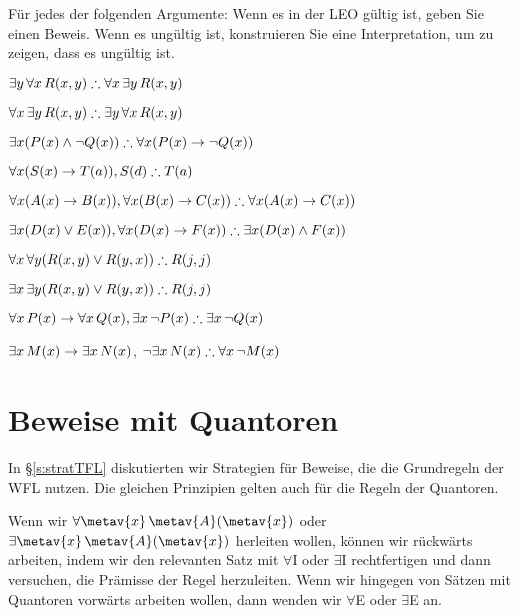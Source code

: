 \solutions
\problempart
\label{pr.FOLvalidornot}
Für jedes der folgenden Argumente: Wenn es in der LEO gültig ist, geben Sie einen Beweis. Wenn es ungültig ist, konstruieren Sie eine Interpretation, um zu zeigen, dass es ungültig ist.
\begin{earg}
\item $\exists y\,\forall x\,\atom{R}{x,y} \therefore \forall x\,\exists y\,\atom{R}{x,y}$
\item $\forall x\,\exists y\,\atom{R}{x,y} \therefore  \exists y\,\forall x\,\atom{R}{x,y}$
\item $\exists x(\atom{P}{x} \eand \enot \atom{Q}{x}) \therefore \forall x(\atom{P}{x} \eif \enot \atom{Q}{x})$
\item $\forall x(\atom{S}{x} \eif \atom{T}{a}), \atom{S}{d} \therefore \atom{T}{a}$
\item $\forall x(\atom{A}{x}\eif \atom{B}{x}), \forall x(\atom{B}{x} \eif \atom{C}{x}) \therefore \forall x(\atom{A}{x} \eif \atom{C}{x})$
\item $\exists x(\atom{D}{x} \eor \atom{E}{x}), \forall x(\atom{D}{x} \eif \atom{F}{x}) \therefore \exists x(\atom{D}{x} \eand \atom{F}{x})$
\item $\forall x\,\forall y(\atom{R}{x,y} \eor \atom{R}{y,x}) \therefore \atom{R}{j,j}$
\item $\exists x\,\exists y(\atom{R}{x,y} \eor \atom{R}{y,x}) \therefore \atom{R}{j,j}$
\item $\forall x\,\atom{P}{x} \eif \forall x\,\atom{Q}{x}, \exists x\, \enot\atom{P}{x} \therefore \exists x\, \enot \atom{Q}{x}$
\item $\exists x\,\mathord{M}(x) \rightarrow \exists x\,\mathord{N}(x)$, $\enot \exists x\,\atom{N}{x}\therefore  \forall x\, \enot \atom{M}{x}$
\end{earg}

\chapter{Beweise mit Quantoren}

In \S\ref{s:stratTFL} diskutierten wir Strategien für Beweise, die die Grundregeln der WFL nutzen. Die gleichen Prinzipien gelten auch für die Regeln der Quantoren. 

Wenn wir $\forall \metav{x}\, \atom{\metav{A}}{\metav{x}}$ oder $\exists \metav{x}\, \atom{\metav{A}}{\metav{x}}$ herleiten wollen, können wir rückwärts arbeiten, indem wir den relevanten Satz mit $\forall$I oder $\exists$I rechtfertigen und dann versuchen, die Prämisse der Regel herzuleiten. Wenn wir hingegen von Sätzen mit Quantoren vorwärts arbeiten wollen, dann wenden wir $\forall$E oder $\exists$E an. 

